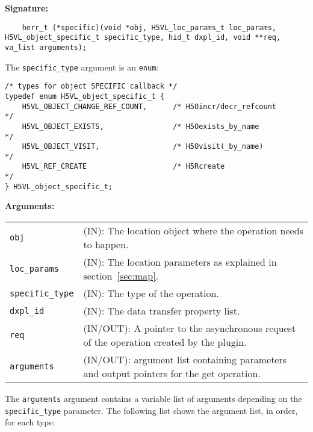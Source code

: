 \begin{mdframed}[style=bgbox]
\textbf{Signature:}
\begin{lstlisting}
	herr_t (*specific)(void *obj, H5VL_loc_params_t loc_params, H5VL_object_specific_t specific_type, hid_t dxpl_id, void **req, va_list arguments);
\end{lstlisting}

The \texttt{specific\_type} argument is an \texttt{enum}:
\begin{lstlisting}
/* types for object SPECIFIC callback */
typedef enum H5VL_object_specific_t {
    H5VL_OBJECT_CHANGE_REF_COUNT,      /* H5Oincr/decr_refcount              */
    H5VL_OBJECT_EXISTS,                /* H5Oexists_by_name                  */
    H5VL_OBJECT_VISIT,                 /* H5Ovisit(_by_name)                 */
    H5VL_REF_CREATE                    /* H5Rcreate                          */
} H5VL_object_specific_t;
\end{lstlisting}

\textbf{Arguments:}\\
\begin{tabular}{l p{10cm}}
  \texttt{obj} & (IN): The location object  where the operation needs to happen.\\
  \texttt{loc\_params} & (IN): The location parameters as explained in section~\ref{sec:map}.\\
  \texttt{specific\_type} & (IN): The type of the operation.\\
  \texttt{dxpl\_id} & (IN): The data transfer property list.\\
  \texttt{req} & (IN/OUT): A pointer to the asynchronous request of the
  operation created by the plugin.\\
  \texttt{arguments} & (IN/OUT): argument list containing parameters and
  output pointers for the get operation. \\
\end{tabular}
\end{mdframed}

The \texttt{arguments} argument contains a variable list of arguments
depending on the \texttt{specific\_type} parameter. The following list shows
the argument list, in order, for each type:

